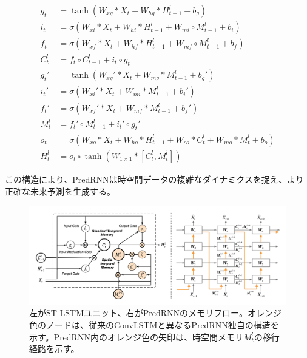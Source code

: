           \begin{align}
          g_t &= \tanh(W_{xg} \ast X_t + W_{hg} \ast H_{t-1}^l + b_g) \\
          i_t &= \sigma(W_{xi} \ast X_t + W_{hi} \ast H_{t-1}^l + W_{mi} \circ M_{t-1}^l + b_i) \\
          f_t &= \sigma(W_{xf} \ast X_t + W_{hf} \ast H_{t-1}^l + W_{mf} \circ M_{t-1}^l + b_f) \\
          C_t^l &= f_t \circ C_{t-1}^l + i_t \circ g_t \\
          g_t' &= \tanh(W_{xg}' \ast X_t + W_{mg} \ast M_{t-1}^l + b_g') \\
          i_t' &= \sigma(W_{xi}' \ast X_t + W_{mi} \ast M_{t-1}^l + b_i') \\
          f_t' &= \sigma(W_{xf}' \ast X_t + W_{mf} \ast M_{t-1}^l + b_f') \\
          M_t^l &= f_t' \circ M_{t-1}^l + i_t' \circ g_t' \\
          o_t &= \sigma(W_{xo} \ast X_t + W_{ho} \ast H_{t-1}^l + W_{co} \ast C_t^l + W_{mo} \ast M_t^l + b_o) \\
          H_t^l &= o_t \circ \tanh(W_{1 \times 1} \ast [C_t^l, M_t^l])
          \end{align}
          
          この構造により、PredRNNは時空間データの複雑なダイナミクスを捉え、より正確な未来予測を生成する。
          
          \begin{figure}[htbp]
            \begin{center}
              \includegraphics[width=160mm]{figures/videoprediction/predrnn_unit.png}
              \caption{左がST-LSTMユニット、右がPredRNNのメモリフロー。オレンジ色のノードは、従来のConvLSTMと異なるPredRNN独自の構造を示す。PredRNN内のオレンジ色の矢印は、時空間メモリ\( M_t^l \)の移行経路を示す。}
              \label{fig:stlstm}
            \end{center}
          \end{figure}
        

